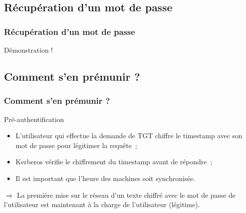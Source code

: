 \documentclass[svgnames]{beamer}
\begin{document}
\subsection{Récupération d'un mot de passe}
\begin{frame}
 \frametitle{Récupération d'un mot de passe}
 
 \begin{center}
  Démonstration !
  
  

 \end{center}
\end{frame}


\subsection{Comment s'en prémunir ?}

\begin{frame}
 \frametitle{Comment s'en prémunir ?}
 
 \begin{block}{Pré-authentification}
  \begin{itemize}
   \item L'utilisateur qui effectue la demande de TGT chiffre le timestamp avec son mot de passe pour légitimer la requête~;
   \item Kerberos vérifie le chiffrement du timestamp avant de répondre~;
   \item Il est important que l'heure des machines soit synchronisée. %
  \end{itemize}
 \end{block}
 
 \pause
 
 $\Rightarrow$ La première mise sur le réseau d'un texte chiffré avec le mot de passe de l'utilisateur est maintenant à la charge de l'utilisateur (légitime).

\end{frame}


\end{document}
